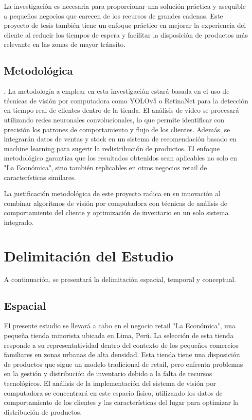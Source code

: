 La investigación es necesaria para proporcionar una solución práctica y asequible a pequeños negocios que carecen de los recursos de grandes cadenas. Este proyecto de tesis también tiene un enfoque práctico en mejorar la experiencia del cliente al reducir los tiempos de espera y facilitar la disposición de productos más relevante en las zonas de mayor tránsito.

\subsection{Metodológica}. 
La metodología a emplear en esta investigación estará basada en el uso de técnicas de visión por computadora como YOLOv5 o RetinaNet para la detección en tiempo real de clientes dentro de la tienda. El análisis de video se procesará utilizando redes neuronales convolucionales, lo que permite identificar con precisión los patrones de comportamiento y flujo de los clientes. Además, se integrarán datos de ventas y stock en un sistema de recomendación basado en machine learning para sugerir la redistribución de productos. El enfoque metodológico garantiza que los resultados obtenidos sean aplicables no solo en "La Económica", sino también replicables en otros negocios retail de características similares.

La justificación metodológica de este proyecto radica en su innovación al combinar algoritmos de visión por computadora con técnicas de análisis de comportamiento del cliente y optimización de inventario en un solo sistema integrado.
\section{Delimitación del Estudio}
A continuación, se presentará la delimitación espacial, temporal y conceptual.
\subsection{Espacial}
El presente estudio se llevará a cabo en el negocio retail "La Económica", una pequeña tienda minorista ubicada en Lima, Perú. La selección de esta tienda responde a su representatividad dentro del contexto de los pequeños comercios familiares en zonas urbanas de alta densidad. Esta tienda tiene una disposición de productos que sigue un modelo tradicional de retail, pero enfrenta problemas en la gestión y distribución de inventario debido a la falta de recursos tecnológicos. El análisis de la implementación del sistema de visión por computadora se concentrará en este espacio físico, utilizando los datos de comportamiento de los clientes y las características del lugar para optimizar la distribución de productos.

